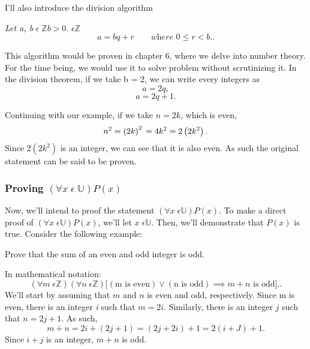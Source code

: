 \documentclass[a4paper]{article}
\begin{document}
I'll also introduce the division algorithm
\begin{tcolorbox}[title=Division Algorithm]
\textit{Let a, b }$\epsilon \; \mathbb{Z}$$b > 0$.  $ \epsilon \mathbb{Z}$ \[
		a = bq + r \qquad \textit{where } 0 \le r < b.
	.\] 	

\end{tcolorbox}
 
This algorithm would be proven in chapter 6, where we delve into number theory. For the time being, we would use it to solve problem without scrutinizing it. In the division theorem, if we take b = 2, we can write every integers as \[
a = 2q
,\] \[
a = 2q + 1
.\]  

\noindent Continuing with our example, if we take $n = 2k$, which is even,
\[
	n ^ 2 = \left( 2k \right) ^ 2 \\
	= 4k^2 \\
	= 2\left( 2k ^ 2 \right).  \\
\]
\noindent Since $2(2k^2)$ is an integer, we can see that it is also even. As such the original statement can be said to be proven.


\subsubsection{Proving $\left( \forall x \; \epsilon \; \mathbb{U} \right)P\left( x \right)  $}

Now, we'll intend to proof the statement $\left( \forall x \; \epsilon \mathbb{U} \right)P\left( x \right)  $. To make a direct proof of  $\left( \forall x \; \epsilon \mathbb{U} \right)P\left( x \right)  $, we'll let $x \; \epsilon \mathbb{U}$. Then, we'll demonstrate that  $P\left( x \right) $ is true. Consider the following example:

\noindent Prove that the sum of an even and odd integer is odd.

\noindent In mathematical notation: \[
	\left( \forall m \; \epsilon \mathbb{Z} \right)\left( \forall  n \; \epsilon \mathbb{Z} \right) [(\text{m is even})\vee\left( \text{n is odd} \right) \implies m + n \text{ is odd].}  
.\]
We'll start by assuming that $m \text{ and } n$ is even and odd, respectively. Since m is even, there is an integer  \textit{i} such that $m = 2i$. Similarly, there is an integer $j$ such that  $n = 2j + 1$. As such,\[
m + n = 2i + \left( 2j + 1 \right) = \left( 2j + 2i \right) + 1 = 2\left( i + J  \right) + 1 
.\]  Since $i + j$ is an integer,  $m + n$ is odd.
\end{document}
